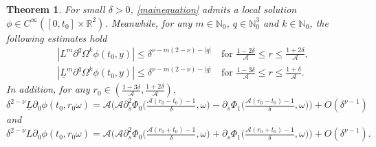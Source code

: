 \documentclass[10pt,a4paper]{amsart}
\newtheorem{theorem}{Theorem}
\begin{document}
\begin{theorem}\label{Local}
For small $\delta > 0$, \eqref{mainequation} admits a local solution $\phi \in C^{\infty}([0, t_0] \times \mathbb{R}^2)$.
Meanwhile, for any $m \in \mathbb{N}_0$, $q \in \mathbb{N}_0^3$ and $k \in \mathbb{N}_0$, the following estimates hold
\begin{align}
&|L^m \partial^q \Omega^k \phi(t_0, y)|
\leq \delta^{\nu-m(2-\nu)-|q|} \quad \text{for } \frac{1 - 2\delta}{\mathcal{A}} \leq r \leq \frac{1 + 2\delta}{\mathcal{A}},\label{initial1}\\
&|\underline L^m \partial^q \Omega^k \phi(t_0, y)|
\leq \delta^{\nu-m(2-\nu)-|q|} \quad \text{for } \frac{1 - 3\delta}{\mathcal{A}} \leq r \leq \frac{1 + \delta}{\mathcal{A}}.\label{initial2}
\end{align}
In addition, for any $r_0\in (\frac{1-3\delta}{\mathcal A}, \frac{1+2\delta}{\mathcal A})$,
\begin{equation}\label{y0}
\delta^{2-\nu}\underline L\partial_{0}\phi(t_0, r_0\omega)=\mathcal{A} \big(\mathcal A\partial_s^2\Phi_0\big(\tfrac{\mathcal A(r_0-t_0)-1}{\delta}, \omega\big)-\partial_s\Phi_1\big(\tfrac{\mathcal A(r_0-t_0)-1}{\delta}, \omega\big)\big)+ O(\delta^{\nu-1})
\end{equation}
and
\begin{equation}\label{y1}
\delta^{2-\nu}L\partial_{0}\phi(t_0, r_0\omega)=\mathcal{A} \big(\mathcal A\partial_s^2\Phi_0\big(\tfrac{\mathcal A(r_0+t_0)-1}{\delta}, \omega\big)+\partial_s\Phi_1\big(\tfrac{\mathcal A(r_0+t_0)-1}{\delta}, \omega\big)\big)+ O(\delta^{\nu-1}).
\end{equation}
\end{theorem}
\end{document}
